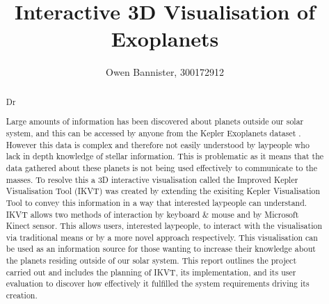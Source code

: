 \documentclass[11pt
              , a4paper
              , twoside
              , openright
              ]{report}
\title{Interactive 3D Visualisation of Exoplanets}
\author{Owen Bannister, 300172912}
\date{}
\begin{document}
\frontmatter



\begin{abstract}
Dr

Large amounts of information has been discovered about planets outside our solar
system, and this can be accessed by anyone from the Kepler
Exoplanets dataset \cite{datasetphl} \cite{dataset}. However this data is
complex and therefore not easily understood by laypeople who lack in depth
knowledge of stellar information. This is problematic as it
means that the data gathered about these planets is not being used
effectively to communicate to the masses. To resolve this a 3D interactive
visualisation called the Improved Kepler Visualisation Tool (IKVT) was created
by extending the exisiting Kepler Visualisation Tool to convey this information
in a way that
interested laypeople can understand. IKVT allows two methods of interaction by
keyboard \& mouse and by Microsoft Kinect sensor. This allows users, interested laypeople, to interact
with the visualisation via traditional means or by a more novel approach
respectively. This visualisation can be used as an
information source for those wanting to increase their knowledge about the
planets residing outside of our solar system. This report outlines the project
carried out and includes the planning of IKVT, its
implementation, and its user
evaluation to discover how effectively it fulfilled the system requirements
driving its
creation.


\end{abstract}


\maketitle



\tableofcontents



\mainmatter

\end{document}
